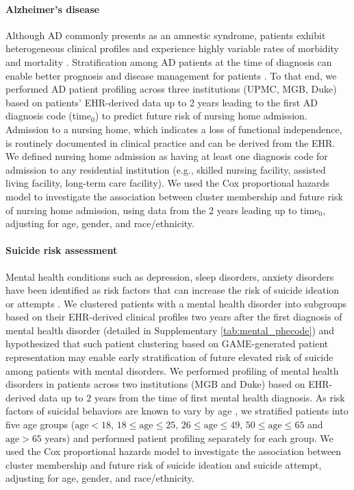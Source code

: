 \documentclass{article}
\begin{document}
\paragraph{Alzheimer's disease} Although AD commonly presents as an amnestic syndrome, patients exhibit heterogeneous clinical profiles and experience highly variable rates of morbidity and mortality \cite{armstrong2022predictors, zheng2024predictors, abdelnour2022perspectives}. Stratification among AD patients at the time of diagnosis can enable better prognosis and disease management for patients \cite{Wangstrat}. To that end, we performed AD patient profiling across three institutions (UPMC, MGB, Duke) based on patients' EHR-derived data up to 2 years leading to the first AD diagnosis code (time$_0$) to predict future risk of nursing home admission. Admission to a nursing home, which indicates a loss of functional independence, is routinely documented in clinical practice and can be derived from the EHR. We defined nursing home admission as having at least one diagnosis code for admission to any residential institution (e.g., skilled nursing facility, assisted living facility, long-term care facility). We used the Cox proportional hazards model to investigate the association between cluster membership and future risk of nursing home admission,  using data from the 2 years leading up to time$_0$, adjusting for age, gender, and race/ethnicity.  


\paragraph{Suicide risk assessment} Mental health conditions such as depression, sleep disorders, anxiety disorders have been identified as risk factors that can increase the risk of suicide ideation or attempts \cite{favril2022risk, sutar2023suicide}. We clustered patients with a mental health disorder into subgroups based on their EHR-derived clinical profiles two years after the first diagnosis of mental health disorder (detailed in Supplementary \ref{tab:mental_phecode}) and hypothesized that such patient clustering based on GAME-generated patient representation may enable early stratification of future elevated risk of suicide among patients with mental disorders. We performed profiling of mental health disorders in patients across two institutions (MGB and Duke) based on EHR-derived data up to $2$ years from the time of first mental health diagnosis. As risk factors of suicidal behaviors are known to vary by age \cite{fazel2020suicide}, we stratified patients into five age groups ($\text{age} < 18$, $18 \le \text{age} \le 25$, $26 \le \text{age} \le 49$, $50\le \text{age} \le 65$  and $\text{age} > 65$ years) and performed patient profiling separately for each group. We used the Cox proportional hazards model to investigate the association between cluster membership and future risk of suicide ideation and suicide attempt, adjusting for age, gender, and race/ethnicity.
\end{document}
